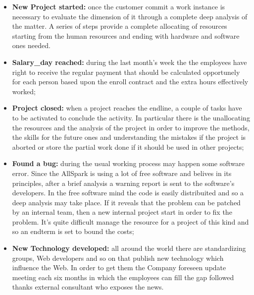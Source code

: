 \begin{itemize}
  \item {\bf New Project started:} once the customer commit a work instance is necessary to evaluate the dimension of it through a complete deep analysis of the matter. A series of steps provide a complete allocating of resources starting from the human resources and ending with hardware and software ones needed.
  \item {\bf Salary\_day reached:} during the last month's week the the employees have right to receive the regular payment that should be calculated opportunely for each person based upon the enroll contract and the extra hours effectively worked;
  \item {\bf Project closed:} when a project reaches the endline, a couple of tasks have to be activated to conclude the activity. In particular there is the unallocating the resources and the analysis of the project in order to improve the methods, the skills for the future ones and understanding the mistakes if the project is aborted or store the partial work done if it should be used in other projects;
  \item {\bf Found a bug:} during the usual working process may happen some software error. Since the AllSpark is using a lot of free software and belives in its principles, after a brief analysis a warning report is sent to the software's developers. In the free software mind the code is easily distribuited and so a deep analysis may take place. If it reveals that the problem can be patched by an internal team, then a new internal project start in order to fix the problem. It's quite difficult manage the resource for a project of this kind and so an endterm is set to bound the costs;
  \item {\bf New Technology developed:} all around the world there are standardizing groups, Web developers and so on that publish new technology which influence the Web. In order to get them the Company foreseen update meeting each six months in which the employees can fill the gap followed thanks external consultant who exposes the news.
\end{itemize}

